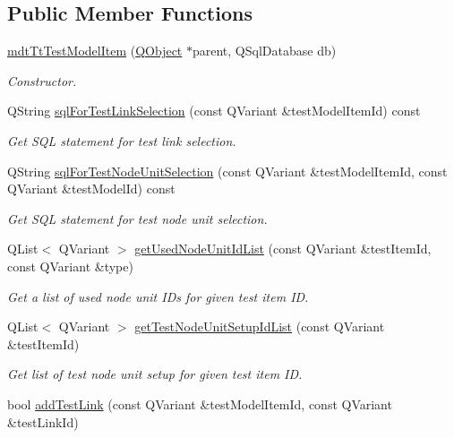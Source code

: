 \subsection*{Public Member Functions}
\begin{DoxyCompactItemize}
\item 
\hyperlink{classmdt_tt_test_model_item_aa410b11d0b8f92dda5e0317f1ecd33ca}{mdt\-Tt\-Test\-Model\-Item} (\hyperlink{class_q_object}{Q\-Object} $\ast$parent, Q\-Sql\-Database db)
\begin{DoxyCompactList}\small\item\em Constructor. \end{DoxyCompactList}\item 
Q\-String \hyperlink{classmdt_tt_test_model_item_a5bb3487ab4f3d9465e2257b4b946efd9}{sql\-For\-Test\-Link\-Selection} (const Q\-Variant \&test\-Model\-Item\-Id) const 
\begin{DoxyCompactList}\small\item\em Get S\-Q\-L statement for test link selection. \end{DoxyCompactList}\item 
Q\-String \hyperlink{classmdt_tt_test_model_item_ad9556478313d628d6b9b505137fc318e}{sql\-For\-Test\-Node\-Unit\-Selection} (const Q\-Variant \&test\-Model\-Item\-Id, const Q\-Variant \&test\-Model\-Id) const 
\begin{DoxyCompactList}\small\item\em Get S\-Q\-L statement for test node unit selection. \end{DoxyCompactList}\item 
Q\-List$<$ Q\-Variant $>$ \hyperlink{classmdt_tt_test_model_item_a0666954f17eab46ef9ef974542486446}{get\-Used\-Node\-Unit\-Id\-List} (const Q\-Variant \&test\-Item\-Id, const Q\-Variant \&type)
\begin{DoxyCompactList}\small\item\em Get a list of used node unit I\-Ds for given test item I\-D. \end{DoxyCompactList}\item 
Q\-List$<$ Q\-Variant $>$ \hyperlink{classmdt_tt_test_model_item_a5db99142e311591716f80d5bf44559ad}{get\-Test\-Node\-Unit\-Setup\-Id\-List} (const Q\-Variant \&test\-Item\-Id)
\begin{DoxyCompactList}\small\item\em Get list of test node unit setup for given test item I\-D. \end{DoxyCompactList}\item 
bool \hyperlink{classmdt_tt_test_model_item_a4084538ebd5e7b4f3df1fcb97f35c86f}{add\-Test\-Link} (const Q\-Variant \&test\-Model\-Item\-Id, const Q\-Variant \&test\-Link\-Id)

\end{DoxyCompactItemize}
